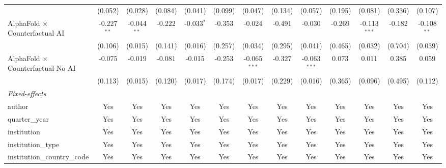 \begin{tabular}{lcccccccccccc}
                                            & (0.052)       & (0.028)       & (0.084)       & (0.041)      & (0.099)      & (0.047)        & (0.134) & (0.057)        & (0.195) & (0.081)        & (0.336) & (0.107)\\   
   AlphaFold $\times$ Counterfactual AI     & -0.227$^{**}$ & -0.044$^{**}$ & -0.222        & -0.033$^{*}$ & -0.353       & -0.024         & -0.491  & -0.030         & -0.269  & -0.113$^{***}$ & -0.182  & -0.108$^{**}$\\   
                                            & (0.106)       & (0.015)       & (0.141)       & (0.016)      & (0.257)      & (0.034)        & (0.295) & (0.041)        & (0.465) & (0.032)        & (0.704) & (0.039)\\   
   AlphaFold $\times$ Counterfactual No AI  & -0.075        & -0.019        & -0.081        & -0.015       & -0.253       & -0.065$^{***}$ & -0.327  & -0.063$^{***}$ & 0.073   & 0.011          & 0.385   & 0.059\\   
                                            & (0.113)       & (0.015)       & (0.120)       & (0.017)      & (0.174)      & (0.017)        & (0.229) & (0.016)        & (0.365) & (0.096)        & (0.495) & (0.112)\\   
   \midrule
   \emph{Fixed-effects}\\
   author                                   & Yes           & Yes           & Yes           & Yes          & Yes          & Yes            & Yes     & Yes            & Yes     & Yes            & Yes     & Yes\\  
   quarter\_year                            & Yes           & Yes           & Yes           & Yes          & Yes          & Yes            & Yes     & Yes            & Yes     & Yes            & Yes     & Yes\\  
   institution                              & Yes           & Yes           & Yes           & Yes          & Yes          & Yes            & Yes     & Yes            & Yes     & Yes            & Yes     & Yes\\  
   institution\_type                        & Yes           & Yes           & Yes           & Yes          & Yes          & Yes            & Yes     & Yes            & Yes     & Yes            & Yes     & Yes\\  
   institution\_country\_code               & Yes           & Yes           & Yes           & Yes          & Yes          & Yes            & Yes     & Yes            & Yes     & Yes            & Yes     & Yes\\  

\end{tabular}
